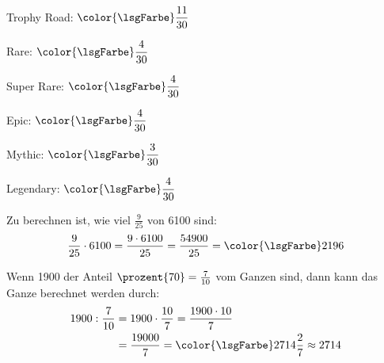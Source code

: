\documentclass[lerntheke,12pt,a5paper,landscape]{arbeitsblatt}
\def\clrLsg{\color{\lsgFarbe}}
\begin{document}
	\begin{loesungskarte}
		\begin{multicols}{2}
		\begin{enuma}
			\item \begin{smallitem}
				\item Trophy Road: $\clrLsg\dfrac{11}{30}$
				\item Rare: $\clrLsg\dfrac{4}{30}$
				\item Super Rare: $\clrLsg\dfrac{4}{30}$
				\item Epic: $\clrLsg\dfrac{4}{30}$
				\item Mythic: $\clrLsg\dfrac{3}{30}$
				\item Legendary: $\clrLsg\dfrac{4}{30}$
			\end{smallitem}

			\item Zu berechnen ist, wie viel $\tfrac{9}{25}$ von \num{6100} sind:
			\[ \frac{9}{25}\cdot 6100 = \frac{9\cdot 6100}{25} = \frac{54900}{25} = \clrLsg2196 \]

			\item Wenn \num{1900} der Anteil $\prozent{70} = \frac{7}{10}$ vom Ganzen sind, dann kann das Ganze berechnet werden durch:
			\begin{align*}
				1900: \frac{7}{10} &= 1900\cdot \frac{10}{7} = \frac{1900\cdot 10}{7} \\
				&= \frac{19000}{7} = \clrLsg 2714\frac{2}{7}\approx 2714
			\end{align*}
		\end{enuma}
		\end{multicols}
	\end{loesungskarte}
\end{document}
